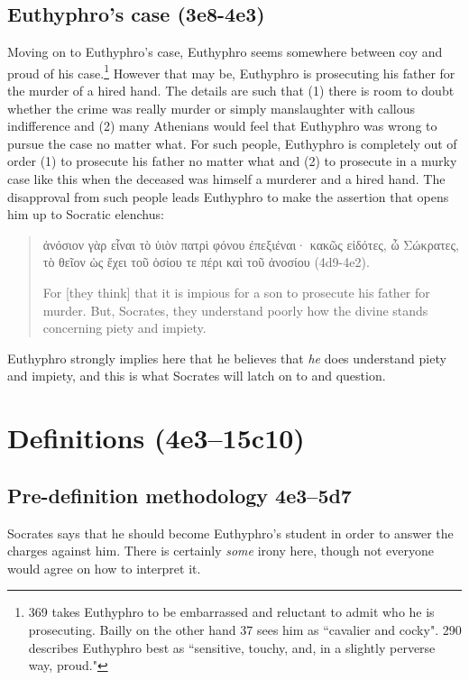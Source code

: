 \documentclass[11pt]{article}
\begin{document}
\subsection{Euthyphro's case (3e8-4e3)}

Moving on to Euthyphro's case, Euthyphro seems somewhere between coy and
proud of his case.\footnote{\citet{geach1966} 369 takes Euthyphro to be
embarrassed and reluctant to admit who he is prosecuting.  Bailly on the
other hand \citeyearpar{bailly2003} 37 sees him as ``cavalier and cocky".
\citet{nehamas1975} 290 describes Euthyphro best as ``sensitive, touchy,
and, in a slightly perverse way, proud."}  However that may be, Euthyphro is
prosecuting his father for the murder of a hired hand. The details are such
that (1) there is room to doubt whether the crime was really murder or
simply manslaughter with callous indifference and (2) many Athenians would
feel that Euthyphro was wrong to pursue the case no matter what.  For such
people, Euthyphro is completely out of order (1) to prosecute his father no
matter what and (2) to prosecute in a murky case like this when the deceased
was himself a murderer and a hired hand.  The disapproval from such people
leads Euthyphro to make the assertion that opens him up to Socratic elenchus:

\begin{quote}
    ἀνόσιον γὰρ εἶναι τὸ ὑιὸν πατρὶ φόνου ἐπεξιέναι· κακῶς εἰδότες,
    ὦ Σώκρατες, τὸ θεῖον ὡς ἔχει τοῦ ὁσίου τε πέρι καὶ τοῦ ἀνοσίου
    (4d9-4e2).

    For [they think] that it is impious for a son to prosecute his father
    for murder. But, Socrates, they understand poorly how the divine stands
    concerning piety and impiety.
\end{quote}

Euthyphro strongly implies here that he believes that \emph{he} does
understand piety and impiety, and this is what Socrates will latch on to
and question.

\section{Definitions (4e3--15c10)}

\subsection{Pre-definition methodology 4e3--5d7}

Socrates says that he should become Euthyphro's student in order to answer
the charges against him. There is certainly \emph{some} irony here, though
not everyone would agree on how to interpret it.
\end{document}
